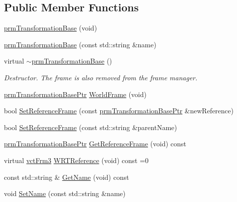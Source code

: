 \subsection*{Public Member Functions}
\begin{DoxyCompactItemize}
\item 
\hyperlink{classprm_transformation_base_adc371d45bc7624d48f3a1c7e67dbdc8d}{prm\+Transformation\+Base} (void)
\item 
\hyperlink{classprm_transformation_base_a32ac37ecee9981c1cd3473fe0468d5e9}{prm\+Transformation\+Base} (const std\+::string \&name)
\item 
virtual \hyperlink{classprm_transformation_base_a929a69f4bae241f7ac4642afd3ab790f}{$\sim$prm\+Transformation\+Base} ()
\begin{DoxyCompactList}\small\item\em Destructor. The frame is also removed from the frame manager. \end{DoxyCompactList}\item 
\hyperlink{prm_transformation_base_8h_a881a6a7d2191474974cdf36d79e1df08}{prm\+Transformation\+Base\+Ptr} \hyperlink{classprm_transformation_base_a5ba18c10d80d47eab444fd1855eccabb}{World\+Frame} (void)
\item 
bool \hyperlink{classprm_transformation_base_a00dcce2732a0fd6679899720175811bf}{Set\+Reference\+Frame} (const \hyperlink{prm_transformation_base_8h_a881a6a7d2191474974cdf36d79e1df08}{prm\+Transformation\+Base\+Ptr} \&new\+Reference)
\item 
bool \hyperlink{classprm_transformation_base_aee556fcc432c0c71afcd11760fa9e1eb}{Set\+Reference\+Frame} (const std\+::string \&parent\+Name)
\item 
\hyperlink{prm_transformation_base_8h_a881a6a7d2191474974cdf36d79e1df08}{prm\+Transformation\+Base\+Ptr} \hyperlink{classprm_transformation_base_a788578194fc2a7bc85ac207a39a77bb7}{Get\+Reference\+Frame} (void) const 
\item 
virtual \hyperlink{vct_transformation_types_8h_a81feda0a02c2d1bc26e5553f409fed20}{vct\+Frm3} \hyperlink{classprm_transformation_base_a64df0853559412fe0c48fc610ad2f6bf}{W\+R\+T\+Reference} (void) const =0
\end{DoxyCompactItemize}
{\bf }\par
\begin{DoxyCompactItemize}
\item 
const std\+::string \& \hyperlink{classprm_transformation_base_aa1d31303da1f577db05fd44dbf5a0e45}{Get\+Name} (void) const 
\item 
void \hyperlink{classprm_transformation_base_a63399acd571f557cca020710f45df4e0}{Set\+Name} (const std\+::string \&name)
\end{DoxyCompactItemize}

